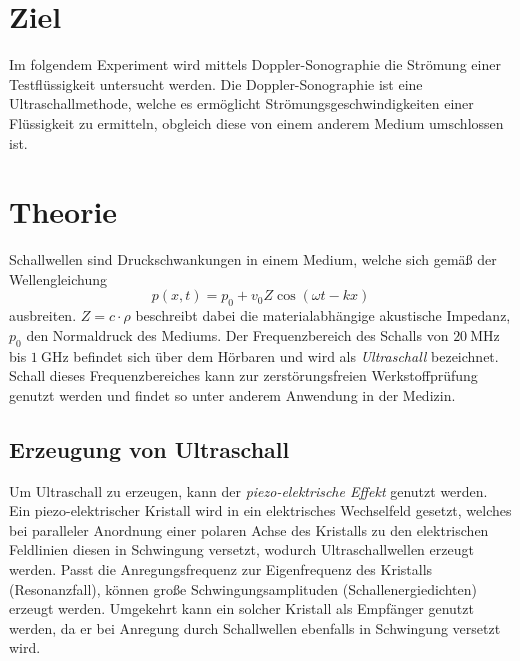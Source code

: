 \section{Ziel}
\label{sec:Ziel}
Im folgendem Experiment wird mittels Doppler-Sonographie die Strömung einer Testflüssigkeit untersucht werden. Die Doppler-Sonographie ist eine Ultraschallmethode, welche es ermöglicht
Strömungsgeschwindigkeiten einer Flüssigkeit zu ermitteln, obgleich diese von einem anderem Medium umschlossen ist.   
\section{Theorie}
\label{sec:Theorie}
Schallwellen sind Druckschwankungen in einem Medium, welche sich gemäß der Wellengleichung
\begin{equation*}
    \label{eqn:Schallwelle}
    p(x,t) = p_0 + v_0 Z \cos \left(\omega t - kx\right)
\end{equation*}
ausbreiten. $Z = c \cdot \rho$ beschreibt dabei die materialabhängige akustische Impedanz, $p_0$ den Normaldruck des Mediums.
Der Frequenzbereich des Schalls von $\qty{20}{\mega\hertz}$ bis $\qty{1}{\giga\hertz}$ befindet sich über dem Hörbaren und wird als \textit{Ultraschall} bezeichnet.
Schall dieses Frequenzbereiches kann zur zerstörungsfreien Werkstoffprüfung genutzt werden und findet so unter anderem Anwendung in der Medizin. \\

\subsection{Erzeugung von Ultraschall}
\label{subsec:Erzeugung}
Um Ultraschall zu erzeugen, kann der \textit{piezo-elektrische Effekt} genutzt werden. Ein piezo-elektrischer Kristall wird in ein elektrisches Wechselfeld gesetzt,
welches bei paralleler Anordnung einer polaren Achse des Kristalls zu den elektrischen Feldlinien diesen in Schwingung versetzt, wodurch Ultraschallwellen erzeugt werden. 
Passt die Anregungsfrequenz zur Eigenfrequenz des Kristalls (Resonanzfall), können große Schwingungsamplituden (Schallenergiedichten) erzeugt werden. 
Umgekehrt kann ein solcher Kristall als Empfänger genutzt werden, da er bei Anregung durch Schallwellen ebenfalls in Schwingung versetzt wird. \\

